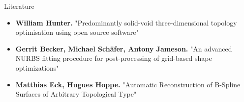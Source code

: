 \begin{frame}{Literature}
\begin{itemize}
\item \textbf{William Hunter.} "Predominantly solid-void three-dimensional topology optimisation using open source software"
\item \textbf{Gerrit Becker, Michael Sch\"afer, Antony Jameson.} "An advanced NURBS fitting procedure for post-processing of grid-based shape optimizations"
\item \textbf{Matthias Eck, Hugues Hoppe.} "Automatic Reconstruction of B-Spline Surfaces of Arbitrary Topological Type"
\end{itemize}
\end{frame}
